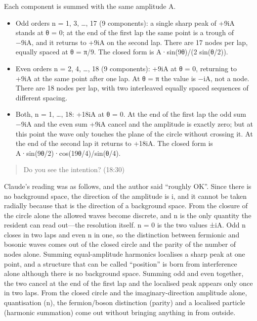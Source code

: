 \documentclass[
  a4paper,
]{article}
\providecommand{\tightlist}{%
  \setlength{\itemsep}{0pt}\setlength{\parskip}{0pt}}
\begin{document}
Each component is summed with the same amplitude A.

\begin{itemize}
\tightlist
\item
  Odd orders n = 1, 3, \ldots, 17 (9 components): a single sharp peak of
  +9iA stands at θ = 0; at the end of the first lap the same point is a
  trough of −9iA, and it returns to +9iA on the second lap. There are 17
  nodes per lap, equally spaced at θ = π/9. The closed form is
  A·sin(9θ)/(2 sin(θ/2)).
\item
  Even orders n = 2, 4, \ldots, 18 (9 components): +9iA at θ = 0,
  returning to +9iA at the same point after one lap. At θ = π the value
  is −iA, not a node. There are 18 nodes per lap, with two interleaved
  equally spaced sequences of different spacing.
\item
  Both, n = 1, \ldots, 18: +18iA at θ = 0. At the end of the first lap
  the odd sum −9iA and the even sum +9iA cancel and the amplitude is
  exactly zero; but at this point the wave only touches the plane of the
  circle without crossing it. At the end of the second lap it returns to
  +18iA. The closed form is A·sin(9θ/2)·cos(19θ/4)/sin(θ/4).
\end{itemize}

\begin{quote}
Do you see the intention? (18:30)
\end{quote}

Claude's reading was as follows, and the author said ``roughly OK''.
Since there is no background space, the direction of the amplitude is i,
and it cannot be taken radially because that is the direction of a
background space. From the closure of the circle alone the allowed waves
become discrete, and n is the only quantity the resident can read
out---the resolution itself. n = 0 is the two values ±iA. Odd n closes
in two laps and even n in one, so the distinction between fermionic and
bosonic waves comes out of the closed circle and the parity of the
number of nodes alone. Summing equal-amplitude harmonics localises a
sharp peak at one point, and a structure that can be called ``position''
is born from interference alone although there is no background space.
Summing odd and even together, the two cancel at the end of the first
lap and the localised peak appears only once in two laps. From the
closed circle and the imaginary-direction amplitude alone, quantisation
(n), the fermion/boson distinction (parity) and a localised particle
(harmonic summation) come out without bringing anything in from outside.
\end{document}
